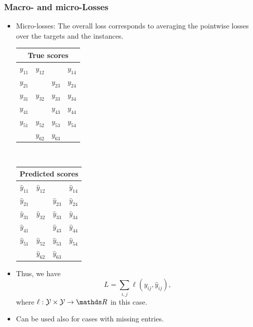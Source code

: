 \documentclass[11pt,compress,t,notes=noshow, xcolor=table]{beamer}
\begin{document}
\begin{frame}
	\frametitle{Macro- and micro-Losses}
	
	\begin{itemize}
		\item<1-> Micro-losses: The overall loss corresponds to averaging the pointwise losses over the targets and the instances.
		
		\begin{center}
			\begin{tabular}{|c|c|c|c|}
				\multicolumn{4}{c}{True scores} \\
				\hline
				\color{putred}$y_{11}$ & \color{putred}$y_{12}$ &   & \color{putred}$y_{14}$ \\
				\color{putred}$y_{21}$ &   & \color{putred}$y_{23}$ & \color{putred}$y_{24}$ \\
				\color{putred}$y_{31}$ & \color{putred}$y_{32}$ & \color{putred}$y_{33}$ & \color{putred}$y_{34}$ \\
				\color{putred}$y_{41}$ &   & \color{putred}$y_{43}$ & \color{putred}$y_{44}$ \\
				\color{putred}$y_{51}$ & \color{putred}$y_{52}$ & \color{putred}$y_{53}$ & \color{putred}$y_{54}$ \\
				& \color{putred}$y_{62}$ & \color{putred}$y_{63}$ &   \\
				\hline
			\end{tabular}
			$\quad$
			\begin{tabular}{|c|c|c|c|}
				\multicolumn{4}{c}{Predicted scores} \\
				\hline
				\color{putred}$\hat{y}_{11}$ & \color{putred}$\hat{y}_{12}$ &   & \color{putred}$\hat{y}_{14}$ \\
				\color{putred}$\hat{y}_{21}$ &   & \color{putred}$\hat{y}_{23}$ & \color{putred}$\hat{y}_{24}$ \\
				\color{putred}$\hat{y}_{31}$ & \color{putred}$\hat{y}_{32}$ & \color{putred}$\hat{y}_{33}$ & \color{putred}$\hat{y}_{34}$ \\
				\color{putred}$\hat{y}_{41}$ &   & \color{putred}$\hat{y}_{43}$ & \color{putred}$\hat{y}_{44}$ \\
				\color{putred}$\hat{y}_{51}$ & \color{putred}$\hat{y}_{52}$ & \color{putred}$\hat{y}_{53}$ & \color{putred}$\hat{y}_{54}$ \\
				& \color{putred}$\hat{y}_{62}$ & \color{putred}$\hat{y}_{63}$ &   \\
				\hline
			\end{tabular}
		\end{center}	
	\lz
	\item Thus, we have	
		$$
	L =  \sum_{i,j} \ell(y_{ij} , \hat{y}_{ij}),
	$$
	where $\ell: \Yspace \times \Yspace \to \R$ in this case.
%	
	\item 	
		Can be used also for cases with missing entries.
	\end{itemize}
 

	
\end{frame}
\end{document}
